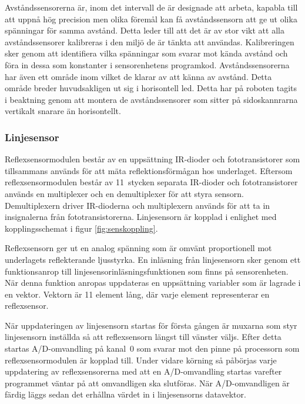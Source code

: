 Avståndssensorerna är, inom det intervall de är designade att arbeta, kapabla till att uppnå hög precision men olika föremål kan få avståndssensorn att ge ut olika spänningar för samma avstånd. Detta leder till att det är av stor vikt att alla avståndssensorer kalibreras i den miljö de är tänkta att användas. Kalibreringen sker genom att identifiera vilka spänningar som svarar mot kända avstånd och föra in dessa som konstanter i sensorenhetens programkod. Avståndssensorerna har även ett område inom vilket de klarar av att känna av avstånd. Detta område breder huvudsakligen ut sig i horisontell led. Detta har på roboten tagits i beaktning genom att montera de avståndssensorer som sitter på sidoskannrarna vertikalt snarare än horisontellt.

\subsubsection{Linjesensor}
\label{sec:linjesensor}
Reflexsensormodulen består av en uppsättning IR-dioder och fototransistorer som tillsammans används för att mäta reflektionsförmågan hos underlaget. Eftersom reflexsensormodulen består av 11~stycken separata IR-dioder och fototransistorer används en multiplexer och en demultiplexer för att styra sensorn. Demultiplexern driver IR-dioderna och multiplexern används för att ta in insignalerna från fototransistorerna. Linjesensorn är kopplad i enlighet med kopplingsschemat i figur \ref{fig:senskoppling}.

Reflexsensorn ger ut en analog spänning som är omvänt proportionell mot underlagets reflekterande ljusstyrka. En inläsning från linjesensorn sker genom ett funktionsanrop till linjesensorinläsningsfunktionen som finns på sensorenheten. När denna funktion anropas uppdateras en uppsättning variabler som är lagrade i en vektor. Vektorn är 11 element lång, där varje element representerar en reflexsensor.

När uppdateringen av linjesensorn startas för första gången är muxarna som styr linjesensorn inställda så att reflexsensorn längst till vänster väljs. Efter detta startas A/D-omvandling på kanal~0 som svarar mot den pinne på processorn som reflexsensormodulen är kopplad till. Under vidare körning så påbörjas varje uppdatering av reflexsensorerna med att en A/D-omvandling startas varefter programmet väntar på att omvandligen ska slutföras. När A/D-omvandligen är färdig läggs sedan det erhållna värdet in i linjesensorns datavektor.


